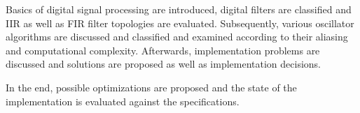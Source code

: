 Basics of digital signal processing are introduced, digital filters are classified and IIR as well as FIR filter topologies are evaluated.
Subsequently, various oscillator algorithms are discussed and classified and examined according to their aliasing and computational complexity.
Afterwards, implementation problems are discussed and solutions are proposed as well as implementation decisions.

In the end, possible optimizations are proposed and the state of the implementation is evaluated against the specifications.

\sffamily{
	\begin{center}
		\textbf{\documentAuthor{}}\\
		\textsc{\university{}}\\
		\universityFaculty{}---\universityDepartment{}\\
		\documentTitle{}\\
		\germanDate{}\today{}\\
		\bigskip{}
	\end{center}
}
